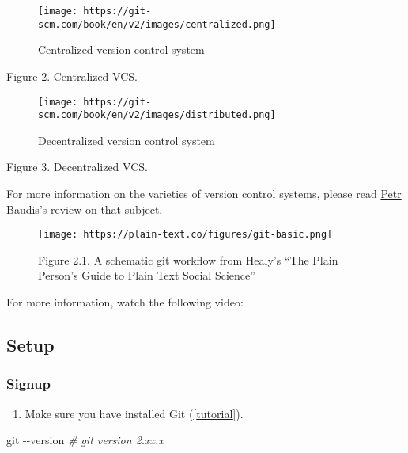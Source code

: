 \documentclass[
]{book}
\newenvironment{Shaded}{\begin{snugshade}}{\end{snugshade}}
\newcommand{\AttributeTok}[1]{\textcolor[rgb]{0.77,0.63,0.00}{#1}}
\newcommand{\CommentTok}[1]{\textcolor[rgb]{0.56,0.35,0.01}{\textit{#1}}}
\newcommand{\FunctionTok}[1]{\textcolor[rgb]{0.00,0.00,0.00}{#1}}
\providecommand{\tightlist}{%
  \setlength{\itemsep}{0pt}\setlength{\parskip}{0pt}}
\begin{document}
\begin{figure}
\centering
\texttt{[image: https://git-scm.com/book/en/v2/images/centralized.png]}
\caption{Centralized version control system}
\end{figure}

Figure 2. Centralized VCS.

\begin{figure}
\centering
\texttt{[image: https://git-scm.com/book/en/v2/images/distributed.png]}
\caption{Decentralized version control system}
\end{figure}

Figure 3. Decentralized VCS.

For more information on the varieties of version control systems, please read \href{https://pdfs.semanticscholar.org/4490/4c70bc91e1bed4fe02b9e2282f031b7c90ea.pdf}{Petr Baudis's review} on that subject.

\begin{figure}
\centering
\texttt{[image: https://plain-text.co/figures/git-basic.png]}
\caption{Figure 2.1. A schematic git workflow from Healy's ``The Plain Person's Guide to Plain Text Social Science''}
\end{figure}

For more information, watch the following video:

\hypertarget{setup}{%
\subsection{Setup}\label{setup}}

\hypertarget{signup}{%
\subsubsection{Signup}\label{signup}}

\begin{enumerate}
\def\labelenumi{\arabic{enumi}.}
\tightlist
\item
  Make sure you have installed Git (\href{https://happygitwithr.com/install-git.html\#install-git}{{[}tutorial{]}}).
\end{enumerate}

\begin{Shaded}
\begin{Highlighting}[]
\FunctionTok{git} \AttributeTok{{-}{-}version} 
\CommentTok{\# git version 2.xx.x}
\end{Highlighting}
\end{Shaded}
\end{document}
